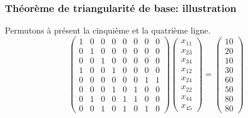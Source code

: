 \documentclass[usepdftitle=false, aspectratio=169]{beamer}
\begin{document}
\begin{frame}
\frametitle{Théorème de triangularité de base: illustration}

Permutons à présent la cinquième et la quatrième ligne.
\[
\begin{pmatrix}
 1 & 0 & 0 & 0 & 0 & 0 & 0 & 0 \\
 0 & 1 & 0 & 0 & 0 & 0 & 0 & 0 \\
 0 & 0 & 1 & 0 & 0 & 0 & 0 & 0 \\
 1 & 0 & 0 & 1 & 0 & 0 & 0 & 0 \\
 0 & 0 & 0 & 0 & 0 & 0 & 1 & 1 \\
 0 & 0 & 0 & 1 & 0 & 1 & 0 & 0 \\
 0 & 1 & 0 & 0 & 1 & 1 & 0 & 0 \\
 0 & 0 & 1 & 0 & 1 & 0 & 1 & 0
\end{pmatrix}
\begin{pmatrix}
x_{11} \\
x_{23} \\
x_{34} \\
x_{12} \\
x_{24} \\
x_{22} \\
x_{44} \\
x_{45}
\end{pmatrix}
=
\begin{pmatrix}
10 \\
20 \\
10 \\
30 \\
60 \\
50 \\
80 \\
80
\end{pmatrix}
\]

\end{frame}
\end{document}
